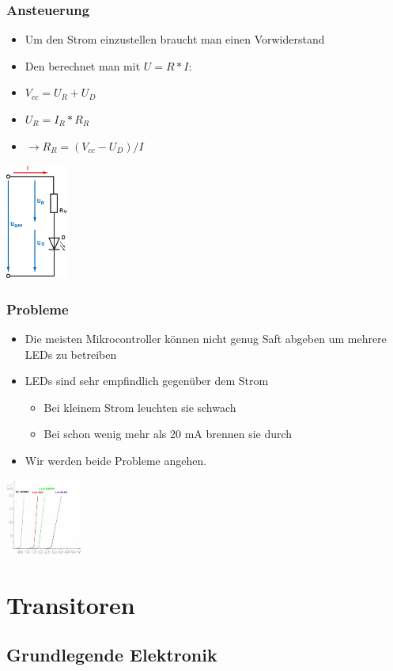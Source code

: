 \documentclass[ngerman,compress]{beamer}
\begin{document}
\begin{frame}
	\frametitle{Ansteuerung}
	\begin{itemize}
		\item Um den Strom einzustellen braucht man einen Vorwiderstand
		\item Den berechnet man mit $U = R * I$:
		\item $V_{cc} = U_R + U_D$
		\item $U_R = I_R * R_R$
		\item $\rightarrow R_R = (V_{cc} - U_D) / I$
	\end{itemize}
	\includegraphics[width=0.8in]{vorwid.png}
\end{frame}

\begin{frame}
	\frametitle{Probleme}
	\begin{itemize}
		\item Die meisten Mikrocontroller können nicht genug Saft abgeben um
			mehrere LEDs zu betreiben
		\item LEDs sind sehr empfindlich gegenüber dem Strom
		\begin{itemize}
			\item Bei kleinem Strom leuchten sie schwach
			\item Bei schon wenig mehr als 20 mA brennen sie durch
		\end{itemize}
		\item Wir werden beide Probleme angehen.
	\end{itemize}
	\includegraphics[width=1in]{led.jpg}
\end{frame}


\section{Transitoren}

\subsection{Grundlegende Elektronik}
\end{document}
